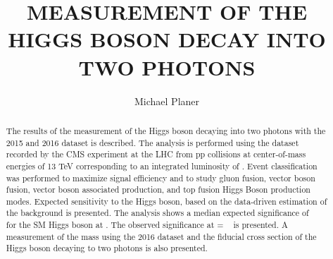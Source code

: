 \documentclass[draft,twoadvisors]{nddiss2e}
\begin{document}
\frontmatter         %

\title{ MEASUREMENT OF THE HIGGS BOSON DECAY INTO TWO PHOTONS}            %
\author{ Michael Planer}           %

\maketitle           %

\makepublicdomain   %

\begin{abstract}
The results of the measurement of the Higgs boson decaying into two photons with the 2015 and 2016 dataset is described.  The analysis is performed using the dataset recorded by the CMS experiment at the LHC from pp collisions at center-of-mass energies of 13 TeV corresponding to an integrated luminosity of \intlumi . Event classification was performed to maximize signal efficiency and to study gluon fusion, vector boson fusion, vector boson associated production, and  top fusion Higgs Boson production modes.  Expected sensitivity to the Higgs boson, based on the data-driven estimation of the background is presented.  The analysis shows a median expected significance of \expsig~ for the SM Higgs boson at \bestmass. The observed significance at \mh = \bestmass~ is presented.  A measurement of the mass using the 2016 dataset and the fiducial cross section of the Higgs boson decaying to two photons is also presented.
\end{abstract}
\end{document}
